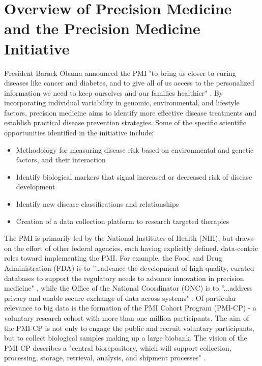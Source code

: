 \section{Overview of Precision Medicine and the Precision Medicine Initiative}

President Barack Obama announced the PMI "to bring us closer to curing diseases like cancer and diabetes, and to give all of 
us access to the personalized information we need to keep ourselves and our families healthier" \cite{obamaVid} 
\cite{Terry2015}. By incorporating individual variability in genomic, environmental, and lifestyle factors, precision 
medicine aims to identify more effective disease treatments and establish practical disease prevention strategies. Some of 
the specific scientific opportunities identified in the initiative include:

\begin{itemize}
  \setlength{\parskip}{1em}\item Methodology for measuring disease risk based on environmental and genetic factors, and their interaction
  \setlength{\parskip}{1em}\item Identify biological markers that signal increased or decreased risk of disease development
  \setlength{\parskip}{1em}\item Identify new disease classifications and relationships
  \setlength{\parskip}{1em}\item Creation of a data collection platform to research targeted therapies
\end{itemize}

The PMI is primarily led by the National Institutes of Health (NIH), but draws on the effort of other federal agencies, each 
having explicitly defined, data-centric roles toward implementing the PMI. For example, the Food and Drug Administration 
(FDA) is to ''…advance the development of high quality, curated databases to support the regulatory needs to advance 
innovation in precision medicine" \cite{Hudson2015}, while the Office of the National Coordinator (ONC) is to ''...address 
privacy and enable secure exchange of data across systems" \cite{Hudson2015}. Of particular relevance to big data is the 
formation of the PMI Cohort Program (PMI-CP) - a voluntary research cohort with more than one million participants. The aim 
of the PMI-CP is not only to engage the public and recruit voluntary participants, but to collect biological samples making 
up a large biobank. The vision of the PMI-CP describes a "central biorepository, which will support collection, processing, 
storage, retrieval, analysis, and shipment processes" \cite{Hudson2015}.


